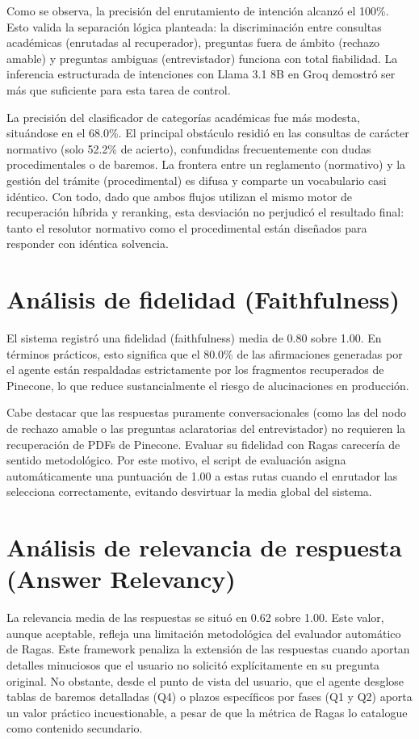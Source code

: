 \documentclass[12pt,a4paper,oneside]{report}
\begin{document}
Como se observa, la precisión del enrutamiento de intención alcanzó el 100\%. Esto valida la separación lógica planteada: la discriminación entre consultas académicas (enrutadas al recuperador), preguntas fuera de ámbito (rechazo amable) y preguntas ambiguas (entrevistador) funciona con total fiabilidad. La inferencia estructurada de intenciones con Llama 3.1 8B en Groq demostró ser más que suficiente para esta tarea de control.

La precisión del clasificador de categorías académicas fue más modesta, situándose en el 68.0\%. El principal obstáculo residió en las consultas de carácter normativo (solo 52.2\% de acierto), confundidas frecuentemente con dudas procedimentales o de baremos. La frontera entre un reglamento (normativo) y la gestión del trámite (procedimental) es difusa y comparte un vocabulario casi idéntico. Con todo, dado que ambos flujos utilizan el mismo motor de recuperación híbrida y reranking, esta desviación no perjudicó el resultado final: tanto el resolutor normativo como el procedimental están diseñados para responder con idéntica solvencia.

\section{Análisis de fidelidad (Faithfulness)}

El sistema registró una fidelidad (faithfulness) media de 0.80 sobre 1.00. En términos prácticos, esto significa que el 80.0\% de las afirmaciones generadas por el agente están respaldadas estrictamente por los fragmentos recuperados de Pinecone, lo que reduce sustancialmente el riesgo de alucinaciones en producción.

Cabe destacar que las respuestas puramente conversacionales (como las del nodo de rechazo amable o las preguntas aclaratorias del entrevistador) no requieren la recuperación de PDFs de Pinecone. Evaluar su fidelidad con Ragas carecería de sentido metodológico. Por este motivo, el script de evaluación asigna automáticamente una puntuación de 1.00 a estas rutas cuando el enrutador las selecciona correctamente, evitando desvirtuar la media global del sistema.

\section{Análisis de relevancia de respuesta (Answer Relevancy)}

La relevancia media de las respuestas se situó en 0.62 sobre 1.00. Este valor, aunque aceptable, refleja una limitación metodológica del evaluador automático de Ragas. Este framework penaliza la extensión de las respuestas cuando aportan detalles minuciosos que el usuario no solicitó explícitamente en su pregunta original. No obstante, desde el punto de vista del usuario, que el agente desglose tablas de baremos detalladas (Q4) o plazos específicos por fases (Q1 y Q2) aporta un valor práctico incuestionable, a pesar de que la métrica de Ragas lo catalogue como contenido secundario.
\end{document}
